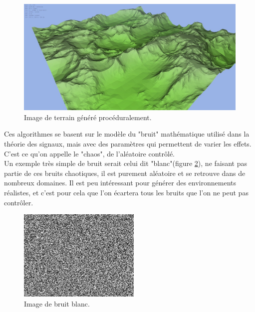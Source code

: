 \documentclass[a4paper]{article}
\begin{document}
    \begin{figure}[!ht]
        \begin{center} \includegraphics[width=0.7\linewidth]{img/landscape.jpg} \end{center}
        \caption{\label{figure5}Image de terrain généré procéduralement\protect\footnotemark .}
    \end{figure}
            
        
    Ces algorithmes se basent sur le modèle du "bruit" mathématique utilisé dans la théorie des signaux, mais avec des paramètres qui permettent de varier les effets. C'est ce qu'on appelle le "chaos", de l'aléatoire contrôlé.\\
    Un exemple très simple de bruit serait celui dit "blanc"(figure \ref{whitenoise}), ne faisant pas partie de ces bruits chaotiques, il est purement aléatoire et se retrouve dans de nombreux domaines. Il est peu intéressant pour générer des environnements réalistes, et c'est pour cela que l'on écartera tous les bruits que l'on ne peut pas contrôler.\\
    
        \begin{figure}[!ht]
        \begin{center} \includegraphics[width=0.4\linewidth]{img/noise/whitenoise.png} \end{center}
        \caption{\label{whitenoise}Image de bruit blanc\protect\footnotemark .}
        \end{figure}
            
\end{document}
